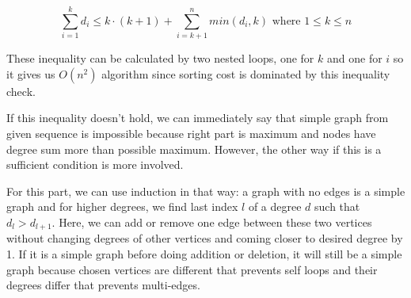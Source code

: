 $$
  \sum_{i=1}^{k} d_i \leq k \cdot (k+1) + \sum_{i=k+1}^{n} min(d_i, k) \text{ where } 1 \leq k \leq n
$$ 

These inequality can be calculated by two nested loops, one for $k$ and one for $i$ so it gives us $O(n^2)$ algorithm since sorting cost is dominated by this inequality check.

If this inequality doesn't hold, we can immediately say that simple graph from given sequence is impossible because right part is maximum and nodes have degree sum more than possible maximum. However, the other way if this is a sufficient condition is more involved. 

For this part, we can use induction in that way: a graph with no edges is a simple graph and for higher degrees, we find last index $l$ of a degree $d$ such that $d_l > d_{l+1}$. Here, we can add or remove one edge between these two vertices without changing degrees of other vertices and coming closer to desired degree by 1. If it is a simple graph before doing addition or deletion, it will still be a simple graph because chosen vertices are different that prevents self loops and their degrees differ that prevents multi-edges.


